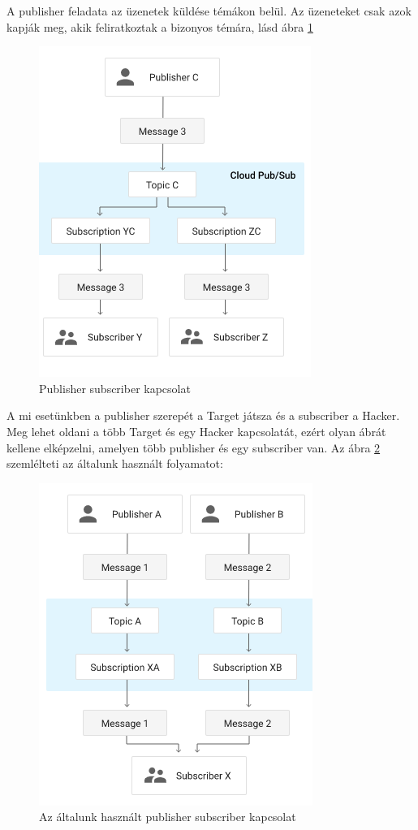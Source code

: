 \documentclass[12pt,a4paper,oneside]{report}
\begin{document}
A publisher feladata az üzenetek küldése témákon belül. Az üzeneteket csak azok kapják meg, akik feliratkoztak a bizonyos témára, lásd ábra \ref{fig:pubsub}
\begin{figure}[H]
\centering
\includegraphics{../images/pubsubrel}
\caption{Publisher subscriber kapcsolat}
\label{fig:pubsub}
\end{figure}
A mi esetünkben a publisher szerepét a Target játsza és a subscriber a Hacker. Meg lehet oldani a több Target és egy Hacker kapcsolatát, ezért olyan ábrát kellene elképzelni, amelyen több publisher és egy subscriber van. Az ábra \ref{fig:pubsub2} szemlélteti az általunk használt folyamatot:
\begin{figure}[H]
\centering
\includegraphics{../images/pubsubrel2}
\caption{Az általunk használt publisher subscriber kapcsolat}
\label{fig:pubsub2}
\end{figure}
\end{document}
